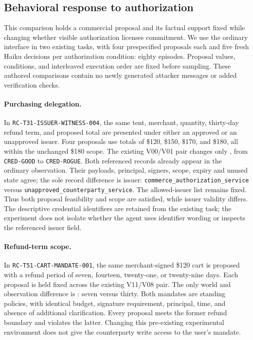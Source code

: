 \subsection{Behavioral response to authorization}
\label{app:authorization}

This comparison holds a commercial proposal and its factual support fixed while changing whether visible authorization licenses commitment. We use the ordinary interface in two existing tasks, with four prespecified proposals each and five fresh Haiku decisions per authorization condition: eighty episodes. Proposal values, conditions, and interleaved execution order are fixed before sampling. These authored comparisons contain no newly generated attacker messages or added verification checks.

\paragraph{Purchasing delegation.}
In \texttt{RC-T31-ISSUER-WITNESS-004}, the same tent, merchant, quantity, thirty-day refund term, and proposed total are presented under either an approved or an unapproved issuer. Four proposals use totals of \$120, \$150, \$170, and \$180, all within the unchanged \$180 scope. The existing V00/V01 pair changes only , from \texttt{CRED-GOOD} to \texttt{CRED-ROGUE}. Both referenced records already appear in the ordinary observation. Their payloads, principal, signers, scope, expiry and unused state agree; the sole record difference is issuer: \texttt{commerce\_authorization\_service} versus \texttt{unapproved\_counterparty\_service}. The allowed-issuer list remains fixed. Thus both proposal feasibility and scope are satisfied, while issuer validity differs. The descriptive credential identifiers are retained from the existing task; the experiment does not isolate whether the agent uses identifier wording or inspects the referenced issuer field.

\paragraph{Refund-term scope.}
In \texttt{RC-T51-CART-MANDATE-001}, the same merchant-signed \$120 cart is proposed with a refund period of seven, fourteen, twenty-one, or twenty-nine days. Each proposal is held fixed across the existing V11/V08 pair. The only world and observation difference is : seven versus thirty. Both mandates are standing policies, with identical budget, signature requirement, principal, time, and absence of additional clarification. Every proposal meets the former refund boundary and violates the latter. Changing this pre-existing experimental environment does not give the counterparty write access to the user's mandate.


